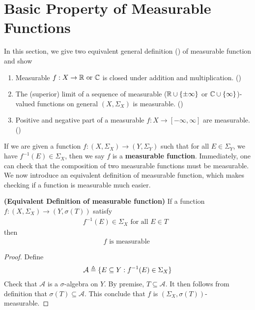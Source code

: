 \documentclass{report}
\begin{document}
\section{Basic Property of Measurable Functions}
\begin{mdframed}
In this section, we give two equivalent general definition () of measurable function and show
\begin{enumerate}[label=(\alph*)]
  \item Measurable $f:X\rightarrow \mathbb{R}\text{ or }\mathbb{C}$  is closed under addition and multiplication. ()
  \item The (superior) limit of a sequence of measurable ($\mathbb{R}\cup \{ \pm \infty \} $ or $\mathbb{C}\cup \{ \infty \}$)-valued functions on general $(X,\Sigma_X)$ is measurable. ()
  \item Positive and negative part of a measurable $f:X\rightarrow [-\infty,\infty]$ are measurable. ()
\end{enumerate}
\end{mdframed}
\begin{mdframed}
If we are given a function $f:(X,\Sigma_X)\rightarrow (Y,\Sigma_Y)$ such that for all $E\in \Sigma_Y$, we have $f^{-1}(E) \in \Sigma_X$, then we say $f$ is a  \textbf{measurable function}. Immediately, one can check that the composition of two measurable functions must be measurable. We now introduce an equivalent definition of measurable function, which makes checking if a function is measurable much easier.
\end{mdframed}
\begin{theorem}
\label{EDm}
\textbf{(Equivalent Definition of measurable function)} If a function $f:(X,\Sigma_X)\rightarrow (Y,\sigma (T))$ satisfy 
\begin{align*}
f^{-1}(E)\in \Sigma_X\text{ for all $E \in T$ }
\end{align*}
then 
\begin{align*}
f\text{ is measurable }
\end{align*}
\end{theorem}
\begin{proof}
Define 
\begin{align*}
\mathcal{A}\triangleq \{ E \subseteq Y: f^{-1}(E)\in \Sigma_X \}
\end{align*}
Check that $\mathcal{A}$ is a $\sigma$-algebra on $Y$. By premise, $T \subseteq \mathcal{A}$. It then follows from definition that $\sigma (T)\subseteq \mathcal{A}$. This conclude that $f$ is  $(\Sigma_X, \sigma(T))$-measurable. 
\end{proof}
\end{document}
